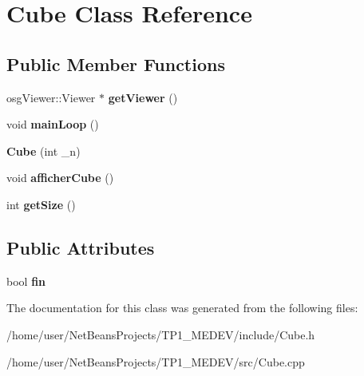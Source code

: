 \hypertarget{classCube}{\section{Cube Class Reference}
\label{classCube}
}
\subsection*{Public Member Functions}
\begin{DoxyCompactItemize}
\item 
\hypertarget{classCube_a60e8fc89a0d4190c49dfefc901296cd1}{osg\+Viewer\+::\+Viewer $\ast$ {\bfseries get\+Viewer} ()}\label{classCube_a60e8fc89a0d4190c49dfefc901296cd1}

\item 
\hypertarget{classCube_aa6273b89c7b3d14d38f7b65b8a46e0e5}{void {\bfseries main\+Loop} ()}\label{classCube_aa6273b89c7b3d14d38f7b65b8a46e0e5}

\item 
\hypertarget{classCube_abfb120dabb6cc6f773d2fa34e31be858}{{\bfseries Cube} (int \+\_\+n)}\label{classCube_abfb120dabb6cc6f773d2fa34e31be858}

\item 
\hypertarget{classCube_a7b014d21a3c986e65bc3e56cd0b9fb60}{void {\bfseries afficher\+Cube} ()}\label{classCube_a7b014d21a3c986e65bc3e56cd0b9fb60}

\item 
\hypertarget{classCube_aac4a2abc359cc0b726599855f90b1097}{int {\bfseries get\+Size} ()}\label{classCube_aac4a2abc359cc0b726599855f90b1097}

\end{DoxyCompactItemize}
\subsection*{Public Attributes}
\begin{DoxyCompactItemize}
\item 
\hypertarget{classCube_aea71c757a46e2d0a019186e2d170c360}{bool {\bfseries fin}}\label{classCube_aea71c757a46e2d0a019186e2d170c360}

\end{DoxyCompactItemize}


The documentation for this class was generated from the following files\+:\begin{DoxyCompactItemize}
\item 
/home/user/\+Net\+Beans\+Projects/\+T\+P1\+\_\+\+M\+E\+D\+E\+V/include/Cube.\+h\item 
/home/user/\+Net\+Beans\+Projects/\+T\+P1\+\_\+\+M\+E\+D\+E\+V/src/Cube.\+cpp\end{DoxyCompactItemize}
